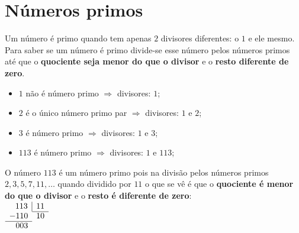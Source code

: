 \section{Números primos}
Um número é primo quando tem apenas $2$ divisores diferentes: o $1$ e ele mesmo.\\
Para saber se um número é primo divide-se esse número pelos números primos até que o \textbf{quociente seja menor do que o divisor} e o \textbf{resto diferente de zero}.

\begin{itemize}
	\item $1$ não é número primo $\Rightarrow$ divisores: $1$;
	\item $2$ é o único número primo par $\Rightarrow$ divisores: $1$ e $2$;
	\item $3$ é número primo $\Rightarrow$ divisores: $1$ e $3$;
	\item $113$ é número primo $\Rightarrow$ divisores: $1$ e $113$;
\end{itemize}

O número $113$ é um número primo pois na divisão pelos números primos $2, 3, 5, 7, 11, \dots$ quando dividido por $11$ o que se vê é que o \textbf{quociente é menor do que o divisor} e o \textbf{resto é diferente de zero}:\\


	$
	\begin{array}{l l r r}
	\multicolumn{2}{r}{113} \vline & \multicolumn{2}{c}{11} \\ \cline{3-4}
	\multicolumn{2}{l}{-110} & \multicolumn{2}{l}{10} \\ \cline{1-2}
	\multicolumn{2}{r}{003} &  \\
	\end{array}
	$
	

